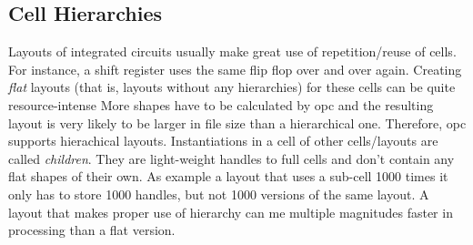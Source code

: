 \subsection{Cell Hierarchies}
Layouts of integrated circuits usually make great use of repetition/reuse of cells.
For instance, a shift register uses the same flip flop over and over again.
Creating \emph{flat} layouts (that is, layouts without any hierarchies) for these cells can be quite resource-intense
More shapes have to be calculated by opc and the resulting layout is very likely to be larger in file size than a hierarchical one.
Therefore, opc supports hierachical layouts.
Instantiations in a cell of other cells/layouts are called \emph{children}.
They are light-weight handles to full cells and don't contain any flat shapes of their own.
As example a layout that uses a sub-cell 1000 times it only has to store 1000 handles, but not 1000 versions of the same layout.
A layout that makes proper use of hierarchy can me multiple magnitudes faster in processing than a flat version.

